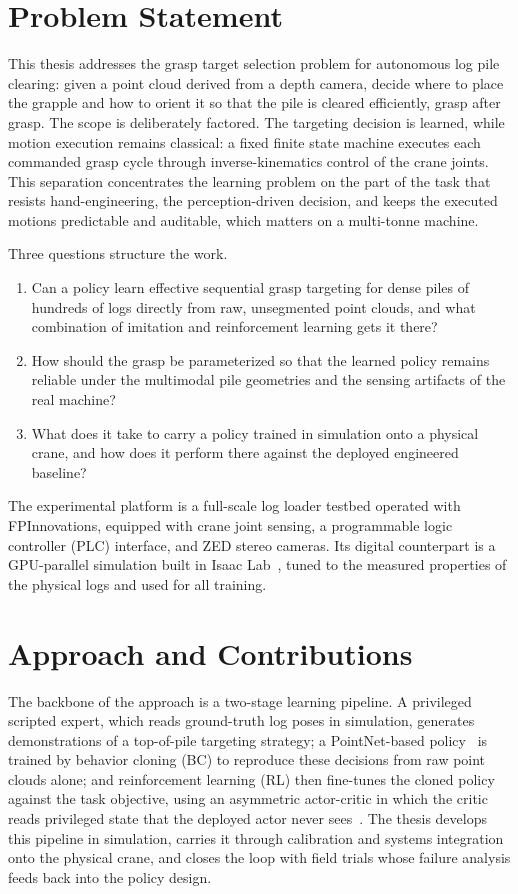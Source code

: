 \section{Problem Statement}

This thesis addresses the grasp target selection problem for autonomous log
pile clearing: given a point cloud derived from a depth camera, decide where to
place the grapple and how to orient it so that the pile is cleared efficiently,
grasp after grasp. The scope is deliberately factored. The targeting decision
is learned, while motion execution remains classical: a fixed finite state
machine executes each commanded grasp cycle through inverse-kinematics control
of the crane joints. This separation concentrates the learning problem on the
part of the task that resists hand-engineering, the perception-driven decision,
and keeps the executed motions predictable and auditable, which matters on a
multi-tonne machine.

Three questions structure the work.
\begin{enumerate}
\item Can a policy learn effective sequential grasp targeting for dense piles
of hundreds of logs directly from raw, unsegmented point clouds, and what
combination of imitation and reinforcement learning gets it there?
\item How should the grasp be parameterized so that the learned policy remains
reliable under the multimodal pile geometries and the sensing artifacts of the
real machine?
\item What does it take to carry a policy trained in simulation onto a physical
crane, and how does it perform there against the deployed engineered baseline?
\end{enumerate}

The experimental platform is a full-scale log loader testbed operated with
FPInnovations, equipped with crane joint sensing, a programmable logic
controller (PLC) interface, and ZED stereo cameras. Its digital counterpart is
a GPU-parallel simulation built in Isaac Lab~\cite{mittal2025isaaclab}, tuned
to the measured properties of the physical logs and used for all training.

\section{Approach and Contributions}

The backbone of the approach is a two-stage learning pipeline. A privileged
scripted expert, which reads ground-truth log poses in simulation, generates
demonstrations of a top-of-pile targeting strategy; a PointNet-based
policy~\cite{qi2017pointnet} is trained by behavior cloning (BC) to reproduce
these decisions from raw point clouds alone; and reinforcement learning (RL)
then fine-tunes the cloned policy against the task objective, using an
asymmetric actor-critic in which the critic reads privileged state that the
deployed actor never sees~\cite{pinto2018asymmetric}. The thesis develops this
pipeline in simulation, carries it through calibration and systems integration
onto the physical crane, and closes the loop with field trials whose failure
analysis feeds back into the policy design.

